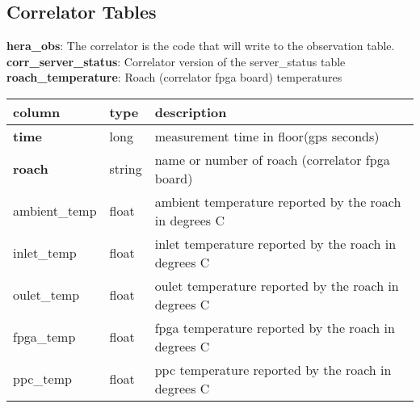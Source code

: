 \documentclass{article}
\begin{document}
\subsection{Correlator Tables}
\textbf{\large{hera\_obs}}: The correlator is the code that will write to the observation table.\\

\textbf{\large{corr\_server\_status}}: Correlator version of the server\_status table\\

\textbf{\large{roach\_temperature}}: Roach (correlator fpga board) temperatures
\begin{center}
 \begin{tabular}{| p{4cm} | p{2cm} | p{10cm} |}
\hline
 column & type & description \\ [0.5ex]  \hline\hline
\textbf{time} & long & measurement time in floor(gps seconds)\\ \hline
\textbf{roach} & string & name or number of roach (correlator fpga board) \\ \hline
ambient\_temp & float & ambient temperature reported by the roach in degrees C \\\hline
inlet\_temp & float & inlet temperature reported by the roach in degrees C \\\hline
oulet\_temp & float & oulet temperature reported by the roach in degrees C \\\hline
fpga\_temp & float & fpga temperature reported by the roach in degrees C \\\hline
ppc\_temp & float & ppc temperature reported by the roach in degrees C \\\hline
\end{tabular}
\end{center}
\end{document}
